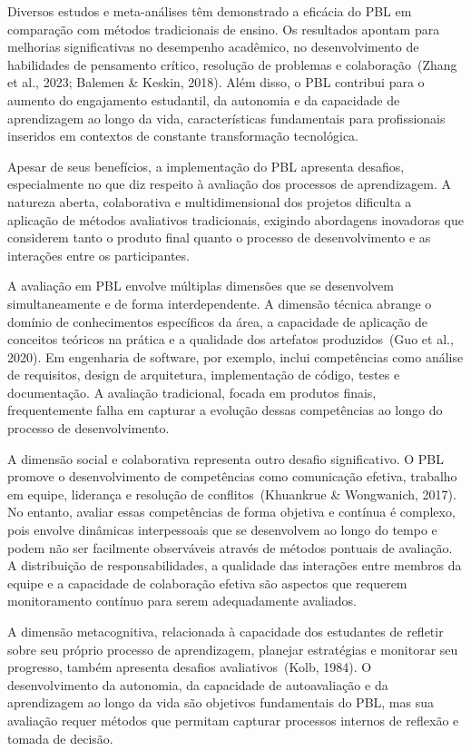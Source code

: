 \documentclass[english, spanish, brazilian]{modelo_dt}
\begin{document}
Diversos estudos e meta-análises têm demonstrado a eficácia do PBL em
comparação com métodos tradicionais de ensino. Os resultados apontam para
melhorias significativas no desempenho acadêmico, no desenvolvimento de
habilidades de pensamento crítico, resolução de problemas e colaboração~(Zhang
et al., 2023; Balemen \& Keskin, 2018). Além disso, o PBL contribui para o
aumento do engajamento estudantil, da autonomia e da capacidade de aprendizagem
ao longo da vida, características fundamentais para profissionais inseridos em
contextos de constante transformação tecnológica.

Apesar de seus benefícios, a implementação do PBL apresenta desafios,
especialmente no que diz respeito à avaliação dos processos de aprendizagem. A
natureza aberta, colaborativa e multidimensional dos projetos dificulta a
aplicação de métodos avaliativos tradicionais, exigindo abordagens inovadoras
que considerem tanto o produto final quanto o processo de desenvolvimento e as
interações entre os participantes.

A avaliação em PBL envolve múltiplas dimensões que se desenvolvem
simultaneamente e de forma interdependente. A dimensão técnica abrange o
domínio de conhecimentos específicos da área, a capacidade de aplicação de
conceitos teóricos na prática e a qualidade dos artefatos produzidos~(Guo et
al., 2020). Em engenharia de software, por exemplo, inclui competências como
análise de requisitos, design de arquitetura, implementação de código, testes e
documentação. A avaliação tradicional, focada em produtos finais,
frequentemente falha em capturar a evolução dessas competências ao longo do
processo de desenvolvimento.

A dimensão social e colaborativa representa outro desafio significativo. O PBL
promove o desenvolvimento de competências como comunicação efetiva, trabalho em
equipe, liderança e resolução de conflitos~(Khuankrue \& Wongwanich, 2017). No
entanto, avaliar essas competências de forma objetiva e contínua é complexo,
pois envolve dinâmicas interpessoais que se desenvolvem ao longo do tempo e
podem não ser facilmente observáveis através de métodos pontuais de avaliação.
A distribuição de responsabilidades, a qualidade das interações entre membros
da equipe e a capacidade de colaboração efetiva são aspectos que requerem
monitoramento contínuo para serem adequadamente avaliados.

A dimensão metacognitiva, relacionada à capacidade dos estudantes de refletir
sobre seu próprio processo de aprendizagem, planejar estratégias e monitorar
seu progresso, também apresenta desafios avaliativos~(Kolb, 1984). O
desenvolvimento da autonomia, da capacidade de autoavaliação e da aprendizagem
ao longo da vida são objetivos fundamentais do PBL, mas sua avaliação requer
métodos que permitam capturar processos internos de reflexão e tomada de
decisão.
\end{document}

